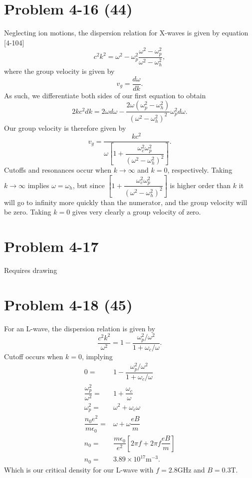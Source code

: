 \section*{Problem 4-16 (44)}
\label{sec:4-16}
Neglecting ion motions, the dispersion relation for X-waves is given by equation [4-104]
\begin{equation*}
	c^2k^2 = \omega^2 - \omega^2_p\dfrac{\omega^2 - \omega_p^2}{\omega^2 - \omega_h^2},
\end{equation*}
where the group velocity is given by
\begin{equation*}
	v_g = \dfrac{d\omega}{dk}.
\end{equation*}
As such, we differentiate both sides of our first equation to obtain
\begin{equation*}
	2kc^2dk = 2\omega d\omega - \dfrac{2\omega(\omega^2_p - \omega^2_h)}{(\omega^2 - \omega_h^2)^2}\omega_p^2d\omega.
\end{equation*}
Our group velocity is therefore given by
\begin{equation*}
	v_g = \dfrac{kc^2}{\omega\left[1 + \dfrac{\omega_c^2\omega_p^2}{(\omega^2 - \omega_h^2)^2} \right]}.
\end{equation*}
Cutoffs and resonances occur when \(k\to\infty \) and \(k=0\), respectively. Taking \(k\to\infty\) implies \(\omega=\omega_h \), but since \(\left[1 + \dfrac{\omega_c^2\omega_p^2}{(\omega^2 - \omega_h^2)^2} \right] \) is higher order than \(k\) it will go to infinity more quickly than the numerator, and the group velocity will be zero. Taking \(k=0\) gives very clearly a group velocity of zero.

\section*{Problem 4-17 }
\label{sec:4-17}
Requires drawing

\section*{Problem 4-18 (45)}
\label{sec:4-18}
For an L-wave, the dispersion relation is given by
\begin{equation*}
	\dfrac{c^2k^2}{\omega^2} = 1 - \dfrac{\omega_p^2/\omega^2}{1 + \omega_c/\omega}.
\end{equation*}
Cutoff occurs when \(k=0\), implying
\begin{align*}
	0=&1 - \dfrac{\omega_p^2/\omega^2}{1 + \omega_c/\omega} \\
	\dfrac{\omega_p^2}{\omega^2} =& 1 + \dfrac{\omega_c}{\omega} \\
	\omega_p^2 =& \omega^2 + \omega_c\omega \\
	\dfrac{n_0e^2}{m\epsilon_0} =& \omega + \omega\dfrac{eB}{m}\\
	n_0 =& \dfrac{m\epsilon_0}{e^2}\left[2\pi f + 2\pi f\dfrac{eB}{m} \right]\\
	n_0 =& 3.89 \times 10^{17}\text{m}^{-3}.
\end{align*}
Which is our critical density for our L-wave with \(f = 2.8\)GHz and \(B = 0.3\)T.

